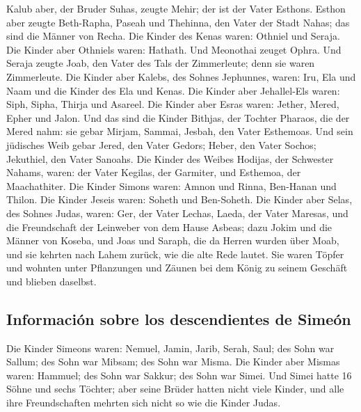  Kalub aber, der Bruder Suhas, zeugte Mehir; der ist der
Vater Esthons.  Esthon aber zeugte Beth-Rapha, Paseah und
Thehinna, den Vater der Stadt Nahas; das sind die Männer von Recha.
 Die Kinder des Kenas waren: Othniel und Seraja. Die
Kinder aber Othniels waren: Hathath.  Und Meonothai
zeuget Ophra. Und Seraja zeugte Joab, den Vater des Tals der
Zimmerleute; denn sie waren Zimmerleute.  Die Kinder aber
Kalebs, des Sohnes Jephunnes, waren: Iru, Ela und Naam und die Kinder
des Ela und Kenas.  Die Kinder aber Jehallel-Els waren:
Siph, Sipha, Thirja und Asareel.  Die Kinder aber Esras
waren: Jether, Mered, Epher und Jalon. Und das sind die Kinder Bithjas,
der Tochter Pharaos, die der Mered nahm: sie gebar Mirjam, Sammai,
Jesbah, den Vater Esthemoas.  Und sein jüdisches Weib
gebar Jered, den Vater Gedors; Heber, den Vater Sochos; Jekuthiel, den
Vater Sanoahs.  Die Kinder des Weibes Hodijas, der
Schwester Nahams, waren: der Vater Kegilas, der Garmiter, und Esthemoa,
der Maachathiter.  Die Kinder Simons waren: Amnon und
Rinna, Ben-Hanan und Thilon. Die Kinder Jeseis waren: Soheth und
Ben-Soheth.  Die Kinder aber Selas, des Sohnes Judas,
waren: Ger, der Vater Lechas, Laeda, der Vater Maresas, und die
Freundschaft der Leinweber von dem Hause Asbeas;  dazu
Jokim und die Männer von Koseba, und Joas und Saraph, die da Herren
wurden über Moab, und sie kehrten nach Lahem zurück, wie die alte Rede
lautet.  Sie waren Töpfer und wohnten unter Pflanzungen
und Zäunen bei dem König zu seinem Geschäft und blieben daselbst.

\hypertarget{informaciuxf3n-sobre-los-descendientes-de-simeuxf3n}{%
\subsection{Información sobre los descendientes de
Simeón}\label{informaciuxf3n-sobre-los-descendientes-de-simeuxf3n}}

 Die Kinder Simeons waren: Nemuel, Jamin, Jarib, Serah,
Saul;  des Sohn war Sallum; des Sohn war Mibsam; des Sohn
war Misma.  Die Kinder aber Mismas waren: Hammuel; des
Sohn war Sakkur; des Sohn war Simei.  Und Simei hatte 16
Söhne und sechs Töchter; aber seine Brüder hatten nicht viele Kinder,
und alle ihre Freundschaften mehrten sich nicht so wie die Kinder Judas.

